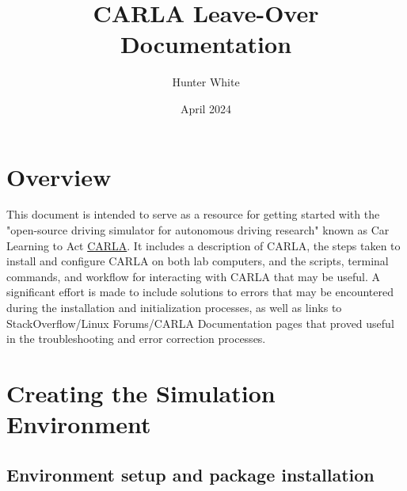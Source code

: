 \documentclass{article}
\title{CARLA Leave-Over Documentation}
\author{Hunter White}
\date{April 2024}
\begin{document}
\maketitle
\newpage
\tableofcontents
\newpage


\section{Overview}
\label{sec:Overview}
This document is intended to serve as a resource for getting started with the "open-source driving simulator for autonomous driving research" known as Car Learning to Act \href{https://carla.org/}{CARLA}. It includes a description of CARLA, the steps taken to install and configure CARLA on both lab computers, and the scripts, terminal commands, and workflow for interacting with CARLA that may be useful. A significant effort is made to include solutions to errors that may be encountered during the installation and initialization processes, as well as links to StackOverflow/Linux Forums/CARLA Documentation pages that proved useful in the troubleshooting and error correction processes.
\section{Creating the Simulation Environment}

\subsection{Environment setup and package installation}
\end{document}

